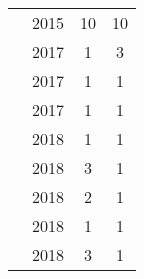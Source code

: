 \begin{table}[t]
\begin{center}
\begin{tabular}{lccc}
    \citet{cully2015robots}         & 2015 & 10 & 10 \\
    
    \citet{cellucci20171d}          & 2017 & 1 & 3 \\
    
    \citet{tobin2017domain}         & 2017 & 1 & 1 \\ %
    
    
    \citet{rusu2017sim}             & 2017 & 1 & 1 \\ %
    
    \citet{peng2018sim}             & 2018 & 1 & 1 \\ %
    
    \citet{Pinto-RSS-18}            & 2018 & 3 & 1 \\ %
    
    \citet{tan2018sim}              & 2018 & 2 & 1 \\ %
    
    
    \citet{pmlr-v87-golemo18a}      & 2018 & 1 & 1 \\ %
    
    \citet{matas2018sim}            & 2018 & 3 & 1 \\ %
    
    
    
    

\end{tabular}
\end{center}
\end{table}
